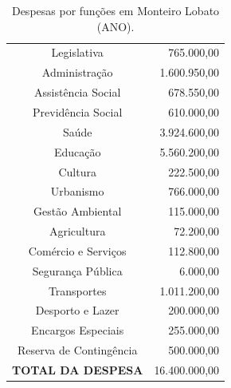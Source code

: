 \begin{table}[htbp]
	\centering
	\caption{Despesas por funções em Monteiro Lobato (ANO).}
	\begin{tabular}{c|r}
		\rowcolor[rgb]{ .984,  .831,  .706} Legislativa & 765.000,00 \\
		\rowcolor[rgb]{ .992,  .914,  .851} Administração & 1.600.950,00 \\
		\rowcolor[rgb]{ .984,  .831,  .706} Assistência Social & 678.550,00 \\
		\rowcolor[rgb]{ .992,  .914,  .851} Previdência Social & 610.000,00 \\
		\rowcolor[rgb]{ .984,  .831,  .706} Saúde & 3.924.600,00 \\
		\rowcolor[rgb]{ .992,  .914,  .851} Educação & 5.560.200,00 \\
		\rowcolor[rgb]{ .984,  .831,  .706} Cultura & 222.500,00 \\
		\rowcolor[rgb]{ .992,  .914,  .851} Urbanismo & 766.000,00 \\
		\rowcolor[rgb]{ .984,  .831,  .706} Gestão Ambiental & 115.000,00 \\
		\rowcolor[rgb]{ .992,  .914,  .851} Agricultura & 72.200,00 \\
		\rowcolor[rgb]{ .984,  .831,  .706} Comércio e Serviços & 112.800,00 \\
		\rowcolor[rgb]{ .992,  .914,  .851} Segurança Pública & 6.000,00 \\
		\rowcolor[rgb]{ .984,  .831,  .706} Transportes & 1.011.200,00 \\
		\rowcolor[rgb]{ .992,  .914,  .851} Desporto e Lazer & 200.000,00 \\
		\rowcolor[rgb]{ .984,  .831,  .706} Encargos Especiais & 255.000,00 \\
		\rowcolor[rgb]{ .992,  .914,  .851} Reserva de Contingência & 500.000,00 \\
		\rowcolor[rgb]{ .984,  .831,  .706} \textbf{TOTAL DA DESPESA} & 16.400.000,00 \\
	\end{tabular}%
	\label{tab:despesas_funcoes}%
\end{table}%

